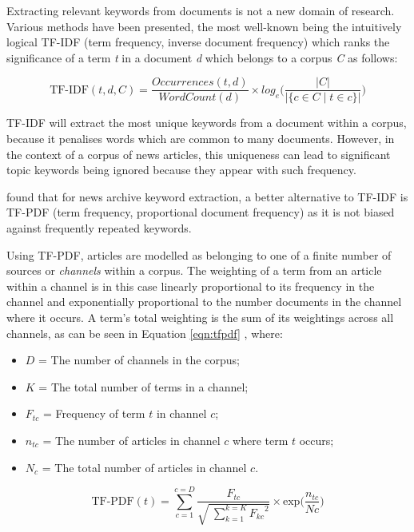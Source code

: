 Extracting relevant keywords from documents is not a new domain of research. Various methods have been presented, the most well-known being the intuitively logical TF-IDF (term frequency, inverse document frequency) \citep{TermWeightingApproachesInAutomaticTextRetrieval} which ranks the significance of a term \textit{t} in a document \textit{d} which belongs to a corpus \textit{C} as follows:

\begin{equation}
	\text{TF-IDF}(t, d, C) = \frac{Occurrences(t, d)}{WordCount(d)} \times log_e\bigg(\frac{|C|}{|\{c \in C \mid t \in c\}|}\bigg)
\label{eqn:tfidf}
\end{equation}

TF-IDF will extract the most unique keywords from a document within a corpus, because it penalises words which are common to many documents. However, in the context of a corpus of news articles, this uniqueness can lead to significant topic keywords being ignored because they appear with such frequency. 

\citet{TopicExtractionfromnewsArchiveUsingTFPDFAlgorithm} found that for news archive keyword extraction, a better alternative to TF-IDF is TF-PDF (term frequency, proportional document frequency) as it is not biased against frequently repeated keywords.

Using TF-PDF, articles are modelled as belonging to one of a finite number of sources or \textit{channels} within a corpus. The weighting of a term from an article within a channel is in this case linearly proportional to its frequency in the channel and exponentially proportional to the number documents in the channel where it occurs. A term's total weighting is the sum of its weightings across all channels, as can be seen in Equation \ref{eqn:tfpdf} \citep{TopicExtractionfromnewsArchiveUsingTFPDFAlgorithm}, where:
\begin{itemize}[noitemsep]
	\item $D$ = The number of channels in the corpus;
	\item $K$ = The total number of terms in a channel;
	\item $F_{tc}$ = Frequency of term $t$ in channel $c$;
	\item $n_{tc}$ = The number of articles in channel $c$ where term $t$ occurs;
	\item $N_c$ = The total number of articles in channel $c$.
\end{itemize}
\begin{equation}
	\label{eqn:tfpdf}
	\text{TF-PDF}(t) = \sum_{c=1}^{c=D}\frac{F_{tc}}{\sqrt{\;\sum\limits_{k=1}^{k=K}{F_{kc}}^2}}\times\text{exp}{\bigg(\frac{n_{tc}}{Nc}\bigg)}
\end{equation}

